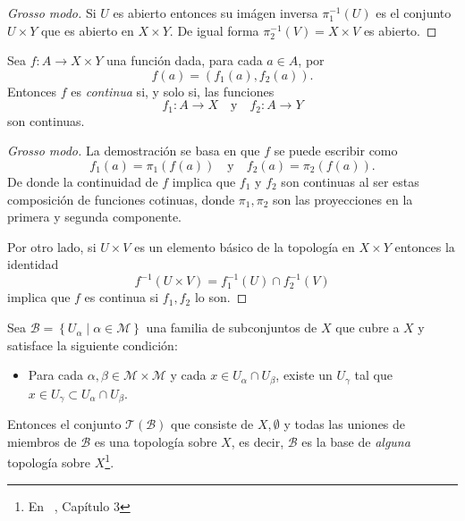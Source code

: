 \documentclass[fleqn,leqno,11pt,letterpaper,final]{article}
\begin{document}
\begin{proof}[Grosso modo]
	Si $U$ es abierto entonces su imágen inversa $\pi_1^{-1}(U)$ es el conjunto $U\times Y$ que es abierto en $X\times Y$. De igual forma $\pi_2^{-1}(V)=X\times V$ es abierto.
\end{proof}

\begin{teo}\label{cont:funccoord}
	Sea $f:A\to X\times Y$ una función dada, para cada $a\in A$, por
	\[
	f(a)=(f_1(a),f_2(a)).
	\]
	Entonces $f$ es \emph{continua} si, y solo si, las funciones
	\[
	f_1:A\to X\quad\text{y}\quad f_2:A\to Y 
	\]
	son continuas. 
\end{teo}

\begin{proof}[Grosso modo]
	La demostración se basa en que $f$ se puede escribir como
	\[
	f_1(a)=\pi_1(f(a))\quad\text{y}\quad
	f_2(a)=\pi_2(f(a)).
	\]
	De donde la continuidad de $f$ implica que $f_1$ y $f_2$ son continuas
	al ser estas composición de funciones cotinuas, donde $\pi_1,\pi_2$ son las proyecciones en la primera y segunda componente.
	
	Por otro lado, si $U\times V$ es un elemento básico de la topología en $X\times Y$ entonces la identidad
	\[
	f^{-1}(U\times V) = f_1^{-1}(U)\cap f_2^{-1}(V)
	\]
	implica que $f$ es continua si $f_1,f_2$ lo son.
\end{proof}

\begin{teo}\label{bases}
	Sea $\mathcal{B}=\left\{ U_\alpha \mid \alpha\in \mathscr{M} \right\}$ una familia de subconjuntos de $X$
	que cubre a $X$ y satisface la siguiente condición:
	\begin{itemize}
		\item 	Para cada $\alpha,\beta\in\mathscr{M}\times\mathscr{M}$ y cada $x\in U_\alpha\cap U_\beta$,
		existe un $U_\gamma$ tal que $x\in U_\gamma\subset U_\alpha\cap U_\beta$.
	\end{itemize}
	
	Entonces el conjunto $\mathcal{T}(\mathcal{B})$ que consiste de $X,\emptyset$ y todas las uniones de miembros
	de $\mathcal{B}$ es una topología sobre $X$, es decir, $\mathcal{B}$ es la base de \emph{alguna}
	topología sobre $X$\footnote{En ~\cite{dugundji_topology_1987}, Capítulo 3}.
\end{teo}
\end{document}
